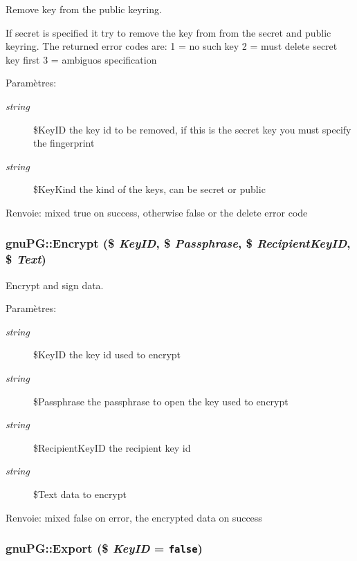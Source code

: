 Remove key from the public keyring.

If secret is specified it try to remove the key from from the secret and public keyring. The returned error codes are: 1 = no such key 2 = must delete secret key first 3 = ambiguos specification

\begin{Desc}
\item[Param\`{e}tres:]
\begin{description}
\item[{\em string}]\$Key\-ID the key id to be removed, if this is the secret key you must specify the fingerprint \item[{\em string}]\$Key\-Kind the kind of the keys, can be secret or public \end{description}
\end{Desc}
\begin{Desc}
\item[Renvoie:]mixed true on success, otherwise false or the delete error code\end{Desc}
\hypertarget{classgnuPG_a6}{
\subsubsection[Encrypt]{\setlength{\rightskip}{0pt plus 5cm}gnu\-PG::Encrypt (\$ {\em Key\-ID}, \$ {\em Passphrase}, \$ {\em Recipient\-Key\-ID}, \$ {\em Text})}}
\label{classgnuPG_a6}


Encrypt and sign data.

\begin{Desc}
\item[Param\`{e}tres:]
\begin{description}
\item[{\em string}]\$Key\-ID the key id used to encrypt \item[{\em string}]\$Passphrase the passphrase to open the key used to encrypt \item[{\em string}]\$Recipient\-Key\-ID the recipient key id \item[{\em string}]\$Text data to encrypt \end{description}
\end{Desc}
\begin{Desc}
\item[Renvoie:]mixed false on error, the encrypted data on success\end{Desc}
\hypertarget{classgnuPG_a3}{
\subsubsection[Export]{\setlength{\rightskip}{0pt plus 5cm}gnu\-PG::Export (\$ {\em Key\-ID} = {\tt false})}}
\label{classgnuPG_a3}


